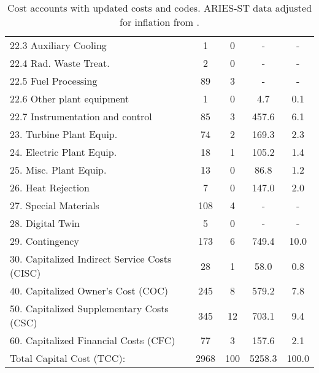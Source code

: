 \begin{table}[h!]
{\begin{tabular}{lcccc}
\hspace{10mm}22.3 Auxiliary Cooling & 1 & 0 & - & - \\
\hspace{10mm}22.4 Rad. Waste Treat. & 2 & 0 & - & - \\
\hspace{10mm}22.5 Fuel Processing & 89 & 3 & - & - \\
\hspace{10mm}22.6 Other plant equipment & 1 & 0 & 4.7 & 0.1 \\
\hspace{10mm}22.7 Instrumentation and control & 85 & 3 & 457.6 & 6.1 \\
\hspace{5mm}23. Turbine Plant Equip. & 74 & 2 & 169.3 & 2.3 \\
\hspace{5mm}24. Electric Plant Equip. & 18 & 1 & 105.2 & 1.4 \\
\hspace{5mm}25. Misc. Plant Equip. & 13 & 0 & 86.8 & 1.2 \\
\hspace{5mm}26. Heat Rejection & 7 & 0 & 147.0 & 2.0 \\
\hspace{5mm}27. Special Materials & 108 & 4 & - & - \\
\hspace{5mm}28. Digital Twin & 5 & 0 & - & - \\
\hspace{5mm}29. Contingency & 173 & 6 & 749.4 & 10.0 \\
30. Capitalized Indirect Service Costs (CISC) & 28 & 1 & 58.0 & 0.8 \\
40. Capitalized Owner’s Cost (COC) & 245 & 8 & 579.2 & 7.8 \\
50. Capitalized Supplementary Costs (CSC) & 345 & 12 & 703.1 & 9.4 \\
60. Capitalized Financial Costs (CFC) & 77 & 3 & 157.6 & 2.1 \\
\hline
Total Capital Cost (TCC): & 2968 & 100 & 5258.3 & 100.0 \\
\hline
\end{tabular}
}
\caption{Cost accounts with updated costs and codes. ARIES-ST data adjusted for inflation from \cite{gordon1986mirror}.}
\label{tab:costs_updated_codes}
\end{table}


